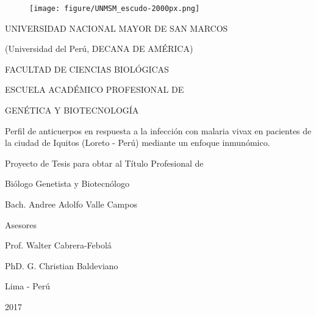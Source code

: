 \documentclass[]{article}
\title{}
\author{}
\date{}
\begin{document}
\renewcommand{\contentsname}{Índice General} 
\renewcommand{\tablename}{Tabla}
\renewcommand{\tableautorefname}{Tabla}


\clearpage
{} \vspace*{\fill}

\begin{centering}

\begin{figure}[!ht]
  \begin{center}
    \texttt{[image: figure/UNMSM\_escudo-2000px.png]}
  \end{center}
\end{figure}

\Large
UNIVERSIDAD NACIONAL MAYOR DE SAN MARCOS

\large
(Universidad del Perú, DECANA DE AMÉRICA)

\vspace{.5 cm}

\Large
FACULTAD DE CIENCIAS BIOLÓGICAS

\vspace{.5 cm}

\normalsize
ESCUELA ACADÉMICO PROFESIONAL DE

GENÉTICA Y BIOTECNOLOGÍA

\vspace{1.5 cm}

\Large
Perfil de anticuerpos en respuesta a la infección con malaria vivax 
en pacientes de la ciudad de Iquitos (Loreto - Perú) %
mediante un enfoque inmunómico.

\vspace{1.5 cm}

\Large
Proyecto de Tesis para obtar al Título Profesional de 

Biólogo Genetista y Biotecnólogo

\vspace{1 cm}

\Large
Bach. Andree Adolfo Valle Campos

\vspace{1 cm}

\Large
Asesores

Prof. Walter Cabrera-Febolá

PhD. G. Christian Baldeviano


\vspace{1 cm}

Lima - Perú

\vspace{.5 cm}

2017

\end{centering}
\end{document}
